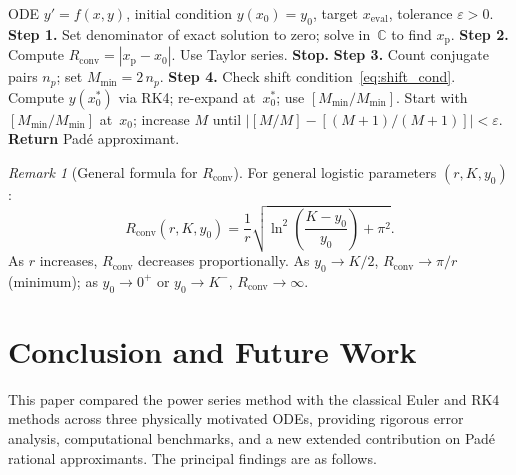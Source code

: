 \documentclass[12pt,a4paper]{article}
\theoremstyle{definition}
\theoremstyle{remark}
\newtheorem{remark}[theorem]{Remark}
\newcommand{\C}{\mathbb{C}}
\newcommand{\Rconv}{R_{\mathrm{conv}}}
\newcommand{\xp}{x_{\mathrm{p}}}
\begin{document}
\begin{algorithm}[H]
  \caption{Padé order selection from singularity structure}
  \label{alg:pade}
  \begin{algorithmic}[1]
    \Require ODE $y' = f(x,y)$, initial condition $y(x_0) = y_0$,
      target $x_{\mathrm{eval}}$, tolerance $\varepsilon > 0$.
    \Statex\textbf{Step 1.} Set denominator of exact solution to zero; solve
      in~$\C$ to find $\xp$.
    \Statex\textbf{Step 2.} Compute $\Rconv = |\xp - x_0|$.
    \If{$x_{\mathrm{eval}} \leq \Rconv$}
      Use Taylor series. \textbf{Stop.}
    \EndIf
    \Statex\textbf{Step 3.} Count conjugate pairs $n_p$; set
      $M_{\min} = 2\,n_p$.
    \Statex\textbf{Step 4.} Check shift condition~\eqref{eq:shift_cond}.
      Compute $y(x_0^*)$ via RK4; re-expand at~$x_0^*$; use
        $[M_{\min}/M_{\min}]$.
    \Else
      Start with $[M_{\min}/M_{\min}]$ at~$x_0$; increase $M$ until
      $|[M/M] - [(M{+}1)/(M{+}1)]| < \varepsilon$.
    \EndIf
    \Statex \textbf{Return} Padé approximant.
  \end{algorithmic}
\end{algorithm}

\begin{remark}[General formula for $\Rconv$]
  For general logistic parameters $(r, K, y_0)$:
  \begin{equation}
    \Rconv(r, K, y_0)
    = \frac{1}{r}\sqrt{\ln^2\!\left(\frac{K - y_0}{y_0}\right) + \pi^2}.
    \label{eq:R_general}
  \end{equation}
  As $r$ increases, $\Rconv$ decreases proportionally.  As $y_0 \to
  K/2$, $\Rconv \to \pi/r$ (minimum); as $y_0 \to 0^+$ or $y_0 \to
  K^-$, $\Rconv \to \infty$.
\end{remark}

\section{Conclusion and Future Work}
\label{sec:conclusion}

This paper compared the power series method with the classical Euler
and RK4 methods across three physically motivated ODEs, providing
rigorous error analysis, computational benchmarks, and a new extended
contribution on Padé rational approximants.  The principal findings
are as follows.
\end{document}
